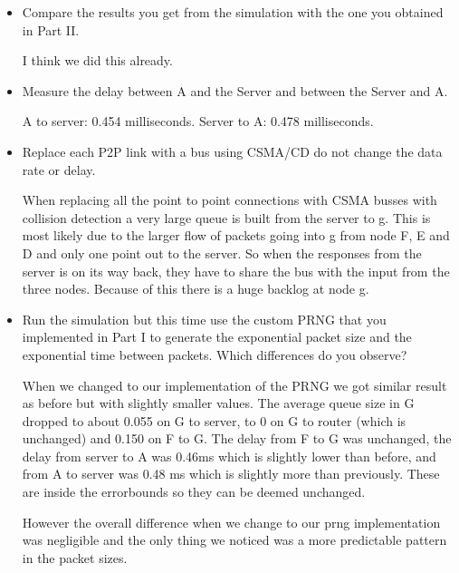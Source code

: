 \documentclass{article}
\begin{document}
\begin{itemize}
\begin{itemize}
\begin{addmargin}[1em]{2em}
        \end{addmargin}
    \end{itemize}
    
    \item Compare the results you get from the simulation with the one you obtained in Part II.
    \begin{addmargin}[1em]{2em}
    I think we did this already.
    \end{addmargin}
    
    \item Measure the delay between A and the Server and between the Server and A.
    \begin{addmargin}[1em]{2em}
    A to server: 0.454 milliseconds.
    Server to A: 0.478 milliseconds.
    \end{addmargin}
    
    \item Replace each P2P link with a bus using CSMA/CD do not change the data rate or delay.
    \begin{addmargin}[1em]{2em}
    When replacing all the point to point connections with CSMA busses with collision detection a very large queue is built from the server to g. This is most likely due to the larger flow of packets going into g from node F, E and D and only one point out to the server. So when the responses from the server is on its way back, they have to share the bus with the input from the three nodes. Because of this there is a huge backlog at node g. 
    \end{addmargin}
    
    \item Run the simulation but this time use the custom PRNG that you implemented in Part I to generate the exponential packet size and the exponential time between packets. Which differences do you observe?
    \begin{addmargin}[1em]{2em}
    When we changed to our implementation of the PRNG we got similar result as before but with slightly smaller values. The average queue size in G dropped to about 0.055 on G to server, to 0 on G to router (which is unchanged) and 0.150 on F to G. The delay from F to G was unchanged, the delay from server to A was 0.46ms which is slightly lower than before, and from A to server was 0.48 ms which is slightly more than previously. These are inside the errorbounds so they can be deemed unchanged. 
    
    However the overall difference when we change to our prng implementation was negligible and the only thing we noticed was a more predictable pattern in the packet sizes.
    \end{addmargin}
\end{itemize}
\end{document}
